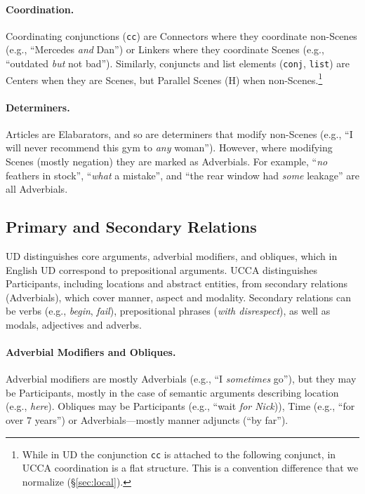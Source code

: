 \documentclass[11pt,a4paper]{article}
\begin{document}
\paragraph{Coordination.}
      Coordinating conjunctions (\texttt{cc}) are Connectors where they coordinate non-Scenes
      (e.g., ``Mercedes \textit{and} Dan'')
      or Linkers where they coordinate Scenes (e.g., ``outdated \textit{but} not bad'').
      Similarly, conjuncts and list elements (\texttt{conj}, \texttt{list}) are Centers when they are Scenes,
      but Parallel Scenes (H) when non-Scenes.\footnote{While in UD 
      the conjunction \texttt{cc} is attached to the following conjunct,
      in UCCA coordination is a flat structure.
      This is a convention difference that we normalize (\S\ref{sec:local}).}

\paragraph{Determiners.}
      Articles are Elabarators, and so are determiners that modify non-Scenes 
      (e.g., ``I will never recommend this gym to \textit{any} woman'').
      However, where modifying Scenes (mostly negation)
      they are marked as Adverbials. For example, ``\textit{no} feathers in stock'', ``\textit{what} a mistake'',
      and ``the rear window had \textit{some} leakage'' are all Adverbials.



\subsection{Primary and Secondary Relations}\label{sec:arguments}

UD distinguishes core arguments, adverbial modifiers,
and obliques, which in English UD correspond to prepositional arguments.
UCCA distinguishes Participants, including locations and abstract entities,
from secondary relations (Adverbials), 
which cover manner, aspect and modality.
Secondary relations can be verbs (e.g., \textit{begin}, \textit{fail}),
prepositional phrases (\textit{with disrespect}),
as well as modals, adjectives and adverbs.

\paragraph{Adverbial Modifiers and Obliques.}
    Adverbial modifiers are mostly Adverbials (e.g., ``I \textit{sometimes} go''),
    but they may be Participants, mostly in the case of semantic arguments describing location (e.g., \textit{here}).
    Obliques
    may be
    Participants (e.g., ``wait \textit{for Nick})), Time (e.g., ``for over 7 years'') 
    or Adverbials---mostly manner adjuncts (``by far'').
\end{document}
